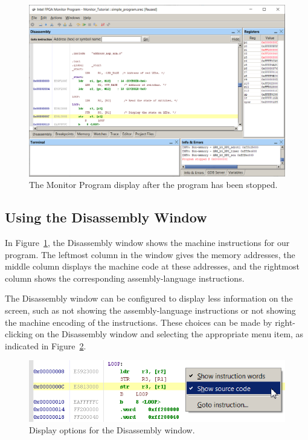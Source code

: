 \documentclass[11pt, twoside, pdftex]{article}
\begin{document}
\begin{figure}[H]
   \begin{center}
      \includegraphics[scale=0.6]{screenshots/figure15.png}
   \end{center}
   \caption{The Monitor Program display after the program has been stopped.}
	 \label{fig:15}
\end{figure}


\subsection{Using the Disassembly Window}
\label{sec:3.4}

In Figure~\ref{fig:15}, the Disassembly window shows the machine
instructions for our program.
The leftmost column in the window gives the memory addresses,
the middle column displays the machine code at these addresses,
and the rightmost column shows the corresponding
assembly-language instructions.

The Disassembly window can be configured to display less information on the screen, such as 
not showing the assembly-language instructions or not showing the machine encoding of the instructions. These choices can 
be made by right-clicking on the Disassembly window and selecting
the appropriate menu item, as indicated in Figure~\ref{fig:16}.

\begin{figure}[H]
   \begin{center}
      \includegraphics[scale=0.8]{screenshots/figure16.png}
   \end{center}
   \caption{Display options for the Disassembly window.}
	 \label{fig:16}
\end{figure}
\end{document}
